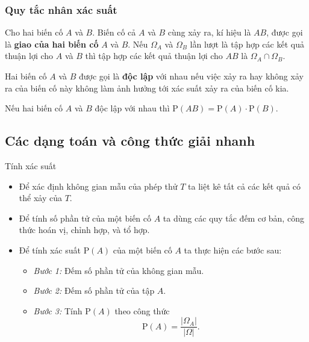 \subsubsection{Quy tắc nhân xác suất}
\begin{dn}
	Cho hai biến cố $A$ và $B$. Biến cố cả $A$ và $B$ cùng xảy ra, kí hiệu là $AB$, được gọi là \textbf{giao của hai biến cố} $A$ và $B$. Nếu $\Omega_A$ và $\Omega_B$ lần lượt là tập hợp các kết quả thuận lợi cho $A$ và $B$ thì tập hợp các kết quả thuận lợi cho $AB$ là $\Omega_A \cap \Omega_B$.
\end{dn}

\begin{dn}
	Hai biến cố $A$ và $B$ được gọi là \textbf{độc lập} với nhau nếu việc xảy ra hay không xảy ra của biến cố này không làm ảnh hưởng tới xác suất xảy ra của biến cố kia. 
\end{dn}

\begin{dl}
	Nếu hai biến cố $A$ và $B$ độc lập với nhau thì
	$\mathrm{P}(AB) = \mathrm{P}(A)\cdot \mathrm{P}(B)$.
\end{dl}

\subsection{Các dạng toán và công thức giải nhanh}

\begin{dang}{Tính xác suất}
	\begin{itemize}
		\item Để xác định không gian mẫu của phép thử $T$ ta liệt kê tất cả các kết quả có thể xảy của $T$. 
		\item Để tính số phần tử của một biến cố $A$ ta dùng các quy tắc đếm cơ bản, công thức hoán vị, chỉnh hợp, và tổ hợp. 
		\item Để tính xác suất $\mathrm{P}(A)$ của một biến cố $A$ ta thực hiện các bước sau:
		\begin{itemize}
			\item \textit{Bước 1:} Đếm số phần tử của không gian mẫu.
			\item \textit{Bước 2:} Đếm số phần tử của tập $A$.
			\item \textit{Bước 3:} Tính $\mathrm{P}(A)$ theo công thức
			\[\mathrm{P}(A) = \frac{|\Omega_A|}{|\Omega|}.\]
		\end{itemize}
	\end{itemize}

\end{dang}

